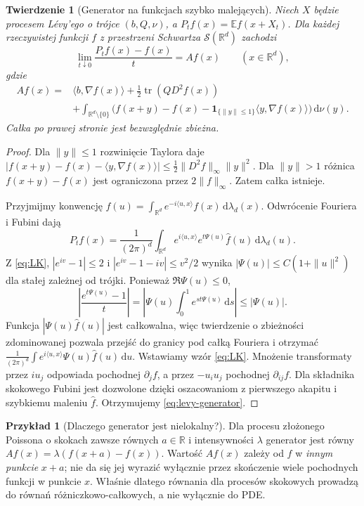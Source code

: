 \documentclass[11pt,a4paper,oneside]{report}
\numberwithin{equation}{chapter}
\theoremstyle{plain}
\newtheorem{twierdzenie}{Twierdzenie}[chapter]
\theoremstyle{definition}
\newtheorem{przyklad}{Przykład}[chapter]
\theoremstyle{remark}
\newcommand{\R}{\mathbb{R}}
\newcommand{\E}{\mathbb{E}}
\newcommand{\calS}{\mathcal{S}}
\newcommand{\ind}[1]{\mathbf{1}_{#1}}
\newcommand{\dd}{\mathrm{d}}
\begin{document}
\begin{twierdzenie}[Generator na funkcjach szybko malejących]
\label{th:levy-generator}
Niech $X$ będzie procesem Lévy'ego o trójce $(b,Q,\nu)$,
a $P_tf(x)=\E f(x+X_t)$. Dla każdej rzeczywistej funkcji
$f$ z przestrzeni Schwartza $\calS(\R^d)$ zachodzi
\[
\lim_{t\downarrow0}\frac{P_tf(x)-f(x)}{t}=Af(x)
\qquad (x\in\R^d),
\]
gdzie
\[
\begin{split}
Af(x)={}&\langle b,\nabla f(x)\rangle
+\frac12\operatorname{tr}(QD^2f(x))\\
&+\int_{\R^d\setminus\{0\}}
\bigl(f(x+y)-f(x)
-\ind{\{\|y\|\le1\}}\langle y,\nabla f(x)\rangle\bigr)
\,\dd\nu(y).
\end{split}
\tag{10.5}\label{eq:levy-generator}
\]
Całka po prawej stronie jest bezwzględnie zbieżna.
\end{twierdzenie}
\begin{proof}
Dla $\|y\|\le1$ rozwinięcie Taylora daje
$|f(x+y)-f(x)-\langle y,\nabla f(x)\rangle|
\le\frac12\|D^2f\|_\infty\|y\|^2$.
Dla $\|y\|>1$ różnica $f(x+y)-f(x)$ jest ograniczona
przez $2\|f\|_\infty$. Zatem całka istnieje.

Przyjmijmy konwencję
$\widehat f(u)=\int_{\R^d}e^{-i\langle u,x\rangle}
 f(x)\,\dd\lambda_d(x)$.
Odwrócenie Fouriera i Fubini dają
\[
P_tf(x)=\frac{1}{(2\pi)^d}\int_{\R^d}
 e^{i\langle u,x\rangle}e^{t\Psi(u)}\widehat f(u)
\,\dd\lambda_d(u).
\]
Z \eqref{eq:LK}, $|e^{iv}-1|\le2$ i
$|e^{iv}-1-iv|\le v^2/2$ wynika
$|\Psi(u)|\le C(1+\|u\|^2)$ dla stałej zależnej
od trójki. Ponieważ $\Re\Psi(u)\le0$,
\[
\left|\frac{e^{t\Psi(u)}-1}{t}\right|
=\left|\Psi(u)\int_0^1e^{st\Psi(u)}\,\dd s\right|
\le|\Psi(u)|.
\]
Funkcja $|\Psi(u)\widehat f(u)|$ jest całkowalna,
więc twierdzenie o zbieżności zdominowanej pozwala
przejść do granicy pod całką Fouriera i otrzymać
$\frac1{(2\pi)^d}\int e^{i\langle u,x\rangle}
\Psi(u)\widehat f(u)\,\dd u$.
Wstawiamy wzór \eqref{eq:LK}. Mnożenie transformaty
przez $iu_j$ odpowiada pochodnej $\partial_j f$, a
przez $-u_i u_j$ pochodnej $\partial_{ij}f$.
Dla składnika skokowego Fubini jest dozwolone dzięki
oszacowaniom z pierwszego akapitu i szybkiemu maleniu
$\widehat f$. Otrzymujemy \eqref{eq:levy-generator}.
\end{proof}

\begin{przyklad}[Dlaczego generator jest nielokalny?]
Dla procesu złożonego Poissona o skokach zawsze równych
$a\in\R$ i intensywności $\lambda$ generator jest równy
$Af(x)=\lambda(f(x+a)-f(x))$.
Wartość $Af(x)$ zależy od $f$ w \emph{innym punkcie} $x+a$;
nie da się jej wyrazić wyłącznie przez skończenie wiele
pochodnych funkcji w punkcie $x$. Właśnie dlatego
równania dla procesów skokowych prowadzą do równań
różniczkowo-całkowych, a nie wyłącznie do PDE.
\end{przyklad}
\end{document}
